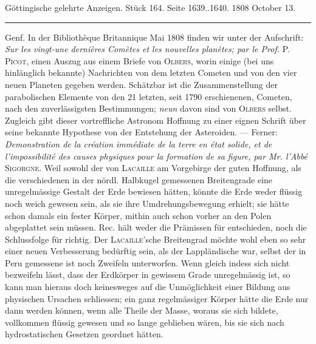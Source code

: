 \clearpage
{}
\hypertarget{native-512-lower}{}\label{native-512-lower}
\begin{center}\small Göttingische gelehrte Anzeigen. Stück 164. Seite 1639..1640. 1808 October 13.\\[3pt]\rule{.72\linewidth}{.3pt}\end{center}

Genf. In der Bibliothèque Britannique Mai 1808 finden wir unter der Aufschrift: \emph{Sur les vingt-une dernières Comètes et les nouvelles planètes; par le Prof.} \textsc{P. Picot}, einen Auszug aus einem Briefe von \textsc{Olbers}, worin einige (bei uns hinlänglich bekannte) Nachrichten von dem letzten Cometen und von den vier neuen Planeten gegeben werden. Schätzbar ist die Zusammenstellung der parabolischen Elemente von den 21 letzten, seit 1790 erschienenen, Cometen, nach den zuverlässigsten Bestimmungen; \emph{neun} davon sind von \textsc{Olbers} selbst. Zugleich gibt dieser vortreffliche Astronom Hoffnung zu einer eignen Schrift über seine bekannte Hypothese von der Entstehung der Asteroiden. --- Ferner: \emph{Demonstration de la création immédiate de la terre en état solide, et de l'impossibilité des causes physiques pour la formation de sa figure, par Mr. l'Abbé} \textsc{Sigorgne}. Weil sowohl der von \textsc{Lacaille} am Vorgebirge der guten Hoffnung, als die verschiedenen in der nördl. Halbkugel gemessenen Breitengrade eine unregelmässige Gestalt der Erde bewiesen hätten, könnte die Erde weder flüssig noch weich gewesen sein, als sie ihre Umdrehungsbewegung erhielt; sie hätte schon damals ein fester Körper, mithin auch schon vorher an den Polen abgeplattet sein müssen. Rec. hält weder die Prämissen für entschieden, noch die Schlussfolge für richtig. Der \textsc{Lacaille}'sche Breitengrad möchte wohl eben so sehr einer neuen Verbesserung bedürftig sein, als der Lappländische war, selbst der in Peru gemessene ist noch Zweifeln unterworfen. Wenn gleich indess sich nicht bezweifeln lässt, dass der Erdkörper in gewissem Grade unregelmässig ist, so kann man hieraus doch keinesweges auf die Unmöglichkeit einer Bildung aus physischen Ursachen schliessen; ein ganz regelmässiger Körper hätte die Erde nur dann werden können, wenn alle Theile der Masse, woraus sie sich bildete, vollkommen flüssig gewesen und so lange geblieben wären, bis sie sich nach hydrostatischen Gesetzen geordnet hätten.
